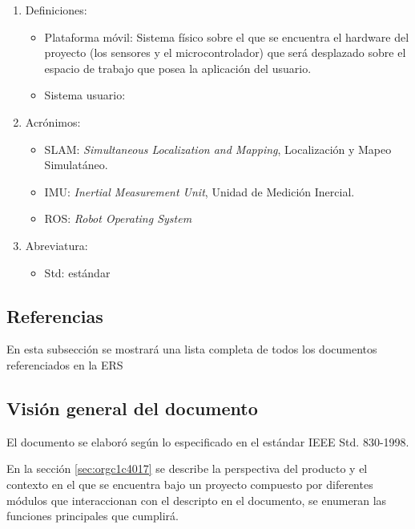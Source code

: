 \documentclass[12pt,a4paper, twosite]{article}
\begin{document}
\begin{enumerate}
  \item Definiciones:
  \begin{itemize}
    \item Plataforma móvil: Sistema físico sobre el que se encuentra el hardware del proyecto
    (los sensores y el microcontrolador) que será desplazado sobre el espacio de trabajo que posea
    la aplicación del usuario.
    \item Sistema usuario: 
  \end{itemize}
  \item Acrónimos:
  \begin{itemize}
    \item SLAM: \textit{Simultaneous Localization and Mapping}, Localización y Mapeo Simulatáneo.
    \item IMU: \textit{Inertial Measurement Unit}, Unidad de Medición Inercial.
    \item ROS: \textit{Robot Operating System}
  \end{itemize}
  \item Abreviatura:
  \begin{itemize}
    \item Std: estándar
  \end{itemize}
\end{enumerate}


\subsection{Referencias}
\label{sec:org62711e0}

En esta subsección se mostrará una lista completa de todos los
documentos referenciados en la ERS


\subsection{Visión general del documento}
\label{sec:orgdaca22c}


El documento se elaboró según lo especificado en el estándar IEEE Std. 830-1998.

En la sección \ref*{sec:orgc1c4017} se describe la perspectiva del producto y el contexto
en el que se encuentra bajo un proyecto compuesto por diferentes módulos que interaccionan con
el descripto en el documento, se enumeran las funciones principales que cumplirá.
\end{document}
